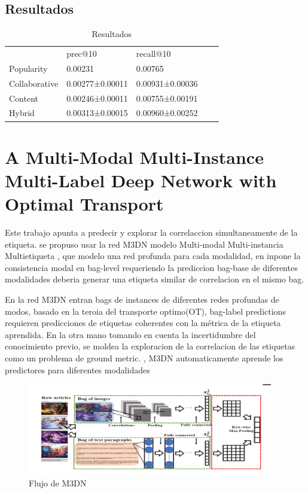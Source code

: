 \documentclass[conference]{IEEEtran}
\begin{document}
\subsection{Resultados}


\begin{table}[]
\centering
\caption{Resultados}
\begin{tabular}{lllll}
		 & prec@10  & recall@10\\
Popularity        & 0.00231 & 0.00765\\
Collaborative        & 0.00277±0.00011& 0.00931±0.00036 \\
Content        & 0.00246±0.00011 & 0.00755±0.00191\\
Hybrid    & 0.00313±0.00015   & 0.00960±0.00252 
\end{tabular}
\end{table}

\section{A Multi-Modal Multi-Instance
Multi-Label Deep Network with Optimal Transport}

Este trabajo apunta a predecir y explorar la correlaccion simultaneamente de la etiqueta. se propuso usar la red M3DN modelo Multi-modal Multi-instancia Multietiqueta , que modelo una red profunda para cada modalidad, en inpone la consistencia modal en bag-level requeriendo la prediccion bag-base de diferentes modalidades deberia generar una etiqueta similar de correlacion en el mismo bag.

En la red M3DN entran  bags de instances de diferentes redes profundas de modos, basado en la teroia del transporte optimo(OT), bag-label predictions  requieren predicciones de etiquetas coherentes con la métrica de la etiqueta aprendida. En la otra mano tomando en cuenta la incertidumbre del conocimiento previo, se moldea la exploracion de la  correlacion de las etiquetas como un problema de ground metric. , 
M3DN automaticamente aprende los predictores para diferentes modalidades 

\begin{figure}
  \includegraphics[width=\textwidth,height=4cm]{figura2.png}
  \caption{Flujo de M3DN}
  \label{fig}
\end{figure}
\end{document}
